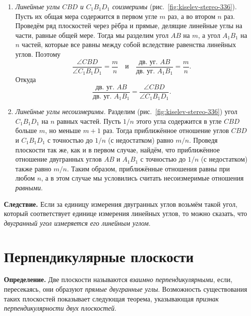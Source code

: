 \begin{enumerate}[label=\arabic*),ref=\arabic*]
    \item \emph{Линейные углы \(CBD\) и \(C_1B_1D_1\) соизмеримы} (рис.~\ref{fig:kiselev-stereo-336}). Пусть их общая мера содержится в первом угле \(m\) раз, а во втором \(n\) раз. Проведём ряд плоскостей через рёбра и прямые, делящие линейные углы на части, равные общей мере. Тогда мы разделим угол \(AB\) на \(m\), а угол \(A_1B_1\) на
    \(n\) частей, которые все равны между собой вследствие равенства линейных углов. Поэтому
    \[
        \frac{\angle CBD}{\angle C_1B_1D_1}=\frac{m}{n}
        \quad\text{и}\quad
        \frac{\text{дв. уг. } AB}{\text{дв. уг. } A_1B_1}=\frac{m}{n}.
    \]
    Откуда
    \[
        \frac{\text{дв. уг. } AB}{\text{дв. уг. } A_1B_1}=
        \frac{\angle CBD}{\angle C_1B_1D_1}.
    \]

    \item \emph{Линейные углы несоизмеримы.} Разделим (рис.~\ref{fig:kiselev-stereo-336}) угол \(C_1B_1D_1\) на \(n\) равных частей. Пусть \(1/n\) этого угла содержится в угле \(CBD\) больше \(m\), но меньше \(m+1\) раз. Тогда приближённое отношение углов \(CBD\) и \(C_1B_1D_1\) с точностью до \(1/n\) (с недостатком) равно \(m/n\). Проведя плоскости так же, как и в первом случае, найдём, что приближённое отношение двугранных углов \(AB\) и \(A_1B_1\) с точностью до \(1/n\) (с недостатком) также равно \(m/n\). Таким образом, приближённые отношения равны при любом \(n\), а в этом случае мы условились считать несоизмеримые отношения \emph{равными}.
\end{enumerate}

 \textbf{Следствие.} Если за единицу измерения двугранных углов возьмём такой угол, который соответствует единице измерения линейных углов, то можно сказать, что \emph{двугранный угол измеряется его линейным углом}.


\section*{Перпендикулярные плоскости}

 \textbf{Определение.} Две плоскости называются \emph{взаимно перпендикулярными}, если, пересекаясь, они образуют \emph{прямые двугранные углы}. Возможность существования таких плоскостей показывает следующая теорема, указывающая \emph{признак перпендикулярности двух плоскостей}.

